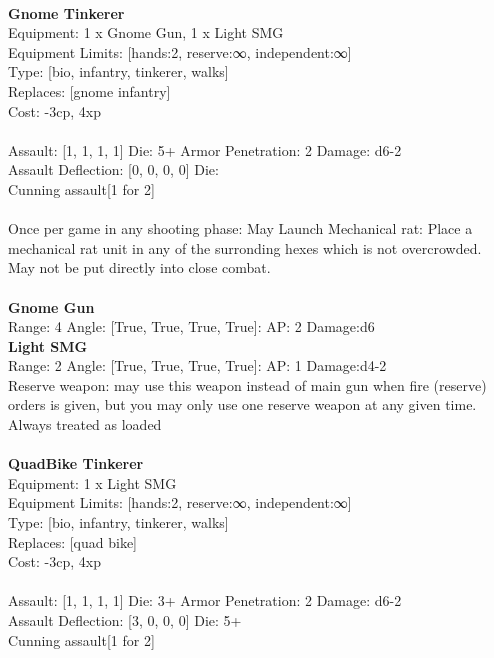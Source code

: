  
\ \\

{\bf Gnome Tinkerer } \\
Equipment: 1 x Gnome Gun, 1 x Light SMG \\
Equipment Limits: [hands:2, reserve:∞, independent:∞] \\
Type: [bio, infantry, tinkerer, walks] \\
Replaces: [gnome infantry] \\
Cost: -3cp, 4xp\\
\ \\
Assault: [1, 1, 1, 1] Die: 5+ Armor Penetration: 2 Damage: d6-2 \\
Assault Deflection: [0, 0, 0, 0] Die: \\
\indent Cunning assault[1 for 2]\\ 
 
\ \\
Once per game in any shooting phase: May Launch Mechanical rat: Place a mechanical rat unit in any of the surronding hexes which is not overcrowded. May not be put directly into close combat. \\ 

\ \\
{\bf Gnome Gun } \\



Range: 4  Angle: [True, True, True, True]: AP: 2 Damage:d6 \\




{\bf Light SMG } \\



Range: 2  Angle: [True, True, True, True]: AP: 1 Damage:d4-2 \\
Reserve weapon: may use this weapon instead of main gun when fire (reserve) orders is given, but you may only use one reserve weapon at any given time.\\ 
Always treated as loaded\\ 




 
\ \\

{\bf QuadBike Tinkerer } \\
Equipment: 1 x Light SMG \\
Equipment Limits: [hands:2, reserve:∞, independent:∞] \\
Type: [bio, infantry, tinkerer, walks] \\
Replaces: [quad bike] \\
Cost: -3cp, 4xp\\
\ \\
Assault: [1, 1, 1, 1] Die: 3+ Armor Penetration: 2 Damage: d6-2 \\
Assault Deflection: [3, 0, 0, 0] Die: 5+\\
\indent Cunning assault[1 for 2]\\ 
 

